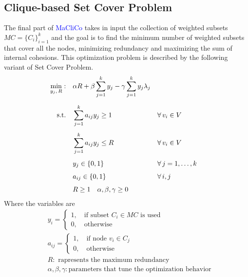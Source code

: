\documentclass[10pt]{article} %
\begin{document}
\subsection{Clique-based Set Cover Problem}
The final part of \textcolor{blue}{MaCliCo} takes in input the collection of weighted subsets $MC = \{C_{i}\}_{i=1}^{k}$ and the goal is to find the minimum number of weighted subsets that cover all the nodes, minimizing redundancy and maximizing the sum of internal cohesions. This optimization problem is described by the following variant of Set Cover Problem.
\begin{align}
  \min_{y_j,\, R}: \quad & \alpha R + \beta \sum_{j=1}^{k} y_j - \gamma \sum_{j=1}^{k} y_j \lambda_j \notag \\[6pt]
  \text{s.t.} \quad
    & \sum_{j=1}^{k} a_{ij} y_j \geq 1 && \forall\, v_i \in V \label{c:cov} \\[4pt]
    & \sum_{j=1}^{k} a_{ij} y_j \leq R && \forall\, v_i \in V \label{c:bound} \\[4pt]
    & y_j \in \{0,1\}                  && \forall\, j = 1,\ldots,k \label{c:bin_y} \\[4pt]
    & a_{ij} \in \{0,1\}               && \forall\, i,j \label{c:bin_a} \\[4pt]
    & R \geq 1\quad \alpha,\beta,\gamma \geq 0 \notag
\end{align}
Where the variables are
\begin{align}
    & y_{i} =
    \begin{cases}
        1, \quad\text{if subset $C_{i}\in MC$ is used}\\
        0, \quad \text{otherwise}
    \end{cases}\\
    &a_{ij} =
    \begin{cases}
        1, \quad\text{if node $v_{i}\in C_{j}$}\\
        0, \quad \text{otherwise}
    \end{cases} \\
    &R :\text{ rapresents the maximum redundancy}\\
    & \alpha, \beta, \gamma : \text{parameters that tune the optimization behavior}
\end{align}
\end{document}
